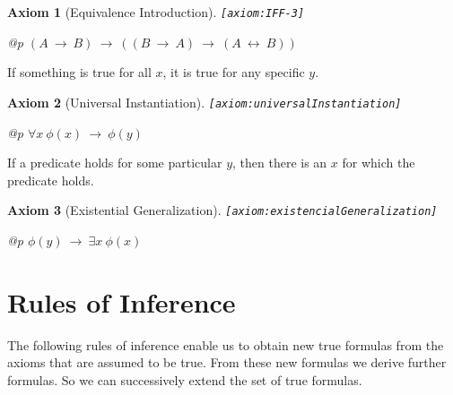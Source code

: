 \documentclass[a4paper,german,10pt,twoside]{book}
\newtheorem{ax}{Axiom}
\theoremstyle{definition}
\theoremstyle{remark}
\begin{document}
\begin{ax}[Equivalence Introduction]
\label{axiom:IFF-3} \hypertarget{axiom:IFF-3}{}
{\tt \tiny [\verb]axiom:IFF-3]]}
\mbox{}
\begin{longtable}{{@{\extracolsep{\fill}}p{\linewidth}}}
\centering $(A\ \rightarrow\ B)\ \rightarrow\ ((B\ \rightarrow\ A)\ \rightarrow\ (A\ \leftrightarrow\ B))$
\end{longtable}

\end{ax}


\par
If something is true for all $x$, it is true for any specific $y$.

\begin{ax}[Universal Instantiation]
\label{axiom:universalInstantiation} \hypertarget{axiom:universalInstantiation}{}
{\tt \tiny [\verb]axiom:universalInstantiation]]}
\mbox{}
\begin{longtable}{{@{\extracolsep{\fill}}p{\linewidth}}}
\centering $\forall x\ \phi(x)\ \rightarrow\ \phi(y)$
\end{longtable}

\end{ax}


\par
If a predicate holds for some particular $y$, then there is an $x$ for which the predicate holds.

\begin{ax}[Existential Generalization]
\label{axiom:existencialGeneralization} \hypertarget{axiom:existencialGeneralization}{}
{\tt \tiny [\verb]axiom:existencialGeneralization]]}
\mbox{}
\begin{longtable}{{@{\extracolsep{\fill}}p{\linewidth}}}
\centering $\phi(y)\ \rightarrow\ \exists x\ \phi(x)$
\end{longtable}

\end{ax}


\section{Rules of Inference} \label{chapter3_section2} \hypertarget{chapter3_section2}{}
The following rules of inference enable us to obtain new true formulas from the axioms that are assumed to be true. From these new formulas we derive further formulas. So we can successively extend the set of true formulas.
\end{document}
